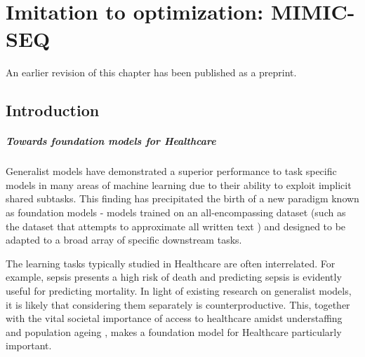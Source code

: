 \chapter{Imitation to optimization: MIMIC-SEQ} \label{ch:mimicseq}

\begin{remark}
    An earlier revision of this chapter \cite{liventsevIntensiveCareOne2024} has been published as a preprint.
\end{remark}

\section{Introduction}

\paragraph{Towards foundation models for Healthcare}

Generalist models have demonstrated a superior performance to task specific models in many areas of machine learning \cite{reedGeneralistAgent2022} due to their ability to exploit implicit shared subtasks. 
This finding has precipitated the birth of a new paradigm known as foundation models \cite{zhouComprehensiveSurveyPretrained2023} - models trained on an all-encompassing dataset (such as the dataset that attempts to approximate all written text \cite{chelbaOneBillionWord2013}) and designed to be adapted to a broad array of specific downstream tasks.

The learning tasks typically studied in Healthcare are often interrelated. 
For example, sepsis presents a high risk of death \cite{schlichtingRecognizingManagingSevere2007} and predicting sepsis is evidently useful for predicting mortality.
In light of existing research on generalist models, it is likely that considering them separately is counterproductive.
This, together with the vital societal importance of access to healthcare amidst understaffing \cite{ashleyy.metcalfHospitalUnitUnderstaffing2016, hudsonUnderstaffing2015, mercerMessageEditorinChief2008, munnUnderstaffingWardsCompromising2017, r.stanleyUnderstaffedOverwhelmed2010, SurveyShowsHidden1993, thelancetHealthcareSystemStaffing2018, UnderstaffingSignificantIssue2012} and population ageing \cite{2012health, Aslam2021Ageing, L1991aging, Lloyd2012Population, Mahishale2015Ageing, Mann2004aging, Sammy2019global, Suzman2015Health}, makes a foundation model for Healthcare particularly important.

